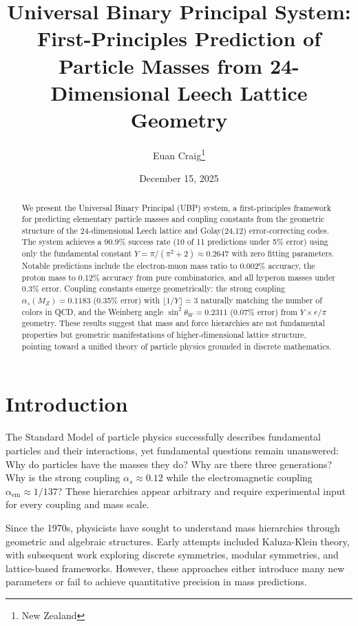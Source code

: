 \documentclass[11pt]{article}
\title{Universal Binary Principal System: First-Principles Prediction of Particle Masses from 24-Dimensional Leech Lattice Geometry}
\author{Euan Craig\thanks{New Zealand}}
\date{December 15, 2025}
\begin{document}
\maketitle

\begin{abstract}
We present the Universal Binary Principal (UBP) system, a first-principles framework for predicting elementary particle masses and coupling constants from the geometric structure of the 24-dimensional Leech lattice and Golay(24,12) error-correcting codes. The system achieves a 90.9\% success rate (10 of 11 predictions under 5\% error) using only the fundamental constant $Y = \pi/(\pi^2 + 2) \approx 0.2647$ with zero fitting parameters. Notable predictions include the electron-muon mass ratio to 0.002\% accuracy, the proton mass to 0.12\% accuracy from pure combinatorics, and all hyperon masses under 0.3\% error. Coupling constants emerge geometrically: the strong coupling $\alpha_s(M_Z) = 0.1183$ (0.35\% error) with $\lfloor 1/Y \rfloor = 3$ naturally matching the number of colors in QCD, and the Weinberg angle $\sin^2\theta_W = 0.2311$ (0.07\% error) from $Y \times e/\pi$ geometry. These results suggest that mass and force hierarchies are not fundamental properties but geometric manifestations of higher-dimensional lattice structure, pointing toward a unified theory of particle physics grounded in discrete mathematics.
\end{abstract}

\section{Introduction}

The Standard Model of particle physics successfully describes fundamental particles and their interactions, yet fundamental questions remain unanswered: Why do particles have the masses they do? Why are there three generations? Why is the strong coupling $\alpha_s \approx 0.12$ while the electromagnetic coupling $\alpha_{\text{em}} \approx 1/137$? These hierarchies appear arbitrary and require experimental input for every coupling and mass scale.

Since the 1970s, physicists have sought to understand mass hierarchies through geometric and algebraic structures. Early attempts included Kaluza-Klein theory, with subsequent work exploring discrete symmetries, modular symmetries, and lattice-based frameworks. However, these approaches either introduce many new parameters or fail to achieve quantitative precision in mass predictions.
\end{document}
